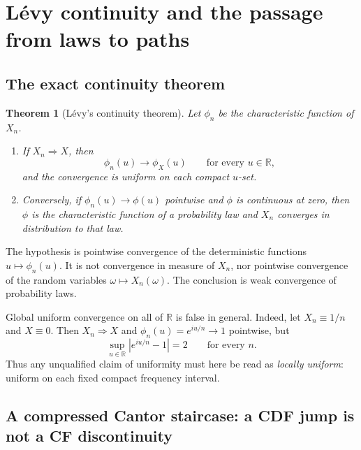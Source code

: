 \documentclass[10pt,a4paper]{article}
\numberwithin{equation}{section}
\theoremstyle{blueplain}
\newtheorem{theorem}{Theorem}[section]
\theoremstyle{definition}
\newcommand{\R}{\mathbb R}
\begin{document}
\section{L\'evy continuity and the passage from laws to paths}
\label{sec:levy-donsker}

\subsection{The exact continuity theorem}

\begin{theorem}[L\'evy's continuity theorem]
Let \(\phi_n\) be the characteristic function of \(X_n\).
\begin{enumerate}[label=(\roman*)]
  \item If \(X_n\Rightarrow X\), then
  \[
    \phi_n(u)\longrightarrow\phi_X(u)
    \qquad\text{for every }u\in\R,
  \]
  and the convergence is uniform on each compact \(u\)-set.
  \item Conversely, if \(\phi_n(u)\to\phi(u)\) pointwise and \(\phi\) is
  continuous at zero, then \(\phi\) is the characteristic function of a
  probability law and \(X_n\) converges in distribution to that law.
\end{enumerate}
\end{theorem}

\begin{keybox}
The hypothesis is pointwise convergence of the deterministic functions
\(u\mapsto\phi_n(u)\).  It is not convergence in measure of \(X_n\), nor
pointwise convergence of the random variables \(\omega\mapsto X_n(\omega)\).
The conclusion is weak convergence of probability laws.
\end{keybox}

Global uniform convergence on all of \(\R\) is false in general.  Indeed, let
\(X_n\equiv1/n\) and \(X\equiv0\).  Then \(X_n\Rightarrow X\) and
\(\phi_n(u)=e^{iu/n}\to1\) pointwise, but
\begin{equation}
  \sup_{u\in\R}|e^{iu/n}-1|=2
  \qquad\text{for every }n.
  \label{eq:no-global-uniform-cf}
\end{equation}
Thus any unqualified claim of uniformity must here be read as \emph{locally
uniform}: uniform on each fixed compact frequency interval.

\subsection{A compressed Cantor staircase: a CDF jump is not a CF discontinuity}
\end{document}
